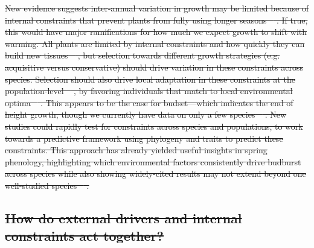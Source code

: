 \documentclass[11pt]{article}
\providecommand{\DIFdeltex}[1]{{\protect\color{red}\sout{#1}}}                      %
\providecommand{\DIFdelbegin}{} %
\providecommand{\DIFdelend}{} %
\providecommand{\DIFdel}[1]{\texorpdfstring{\DIFdeltex{#1}}{}} %
\newcommand{\DIFscaledelfig}{0.5}
\newlength{\DIFdelgraphicswidth} %
\newlength{\DIFdelgraphicsheight} %
\newcommand{\DIFdelincludegraphics}[2][]{%
\sbox{\DIFdelgraphicsbox}{\DIFOincludegraphics[#1]{#2}}%
\settoboxwidth{\DIFdelgraphicswidth}{\DIFdelgraphicsbox} %
\settoboxtotalheight{\DIFdelgraphicsheight}{\DIFdelgraphicsbox} %
\scalebox{\DIFscaledelfig}{%
\parbox[b]{\DIFdelgraphicswidth}{\usebox{\DIFdelgraphicsbox}\\[-\baselineskip] \rule{\DIFdelgraphicswidth}{0em}}\llap{\resizebox{\DIFdelgraphicswidth}{\DIFdelgraphicsheight}{%
\setlength{\unitlength}{\DIFdelgraphicswidth}%
\begin{picture}(1,1)%
\thicklines\linethickness{2pt} %
{\color[rgb]{1,0,0}\put(0,0){\framebox(1,1){}}}%
{\color[rgb]{1,0,0}\put(0,0){\line( 1,1){1}}}%
{\color[rgb]{1,0,0}\put(0,1){\line(1,-1){1}}}%
\end{picture}%
}\hspace*{3pt}}} %
} %
\DeclareRobustCommand{\DIFdelbegin}{\DIFOdelbegin \let\includegraphics\DIFdelincludegraphics} %
\DeclareRobustCommand{\DIFdelend}{\DIFOaddend \let\includegraphics\DIFOincludegraphics} %
\begin{document}
\DIFdelbegin \DIFdel{New evidence suggests inter-annual variation in growth may be limited because of internal constraints that prevent plants from fully using longer seasons \mbox{%
\citep{zohner2023effect}}\hskip0pt%
. If true, this would have major ramifications for how much we expect growth to shift with warming. All plants are limited by internal constraints and how quickly they can build new tissues \mbox{%
\citep{marchand2021timing,luo2024internal}}\hskip0pt%
, but selection towards different growth strategies (e.g. acquisitive versus conservative) should drive variation in these constraints across species. Selection should also drive local adaptation in these constraints at the population-level \mbox{%
\citep{mckown2016impacts,soolanayakanahally2013timing}}\hskip0pt%
, by favoring individuals that match to local environmental optima \mbox{%
\citep{Colautti:2010,mckown2014np}}\hskip0pt%
. This appears to be the case for budset---which indicates the end of height growth, though we currently have data on only a few species \mbox{%
\citep{aitken2016,zeng2024weak}}\hskip0pt%
. New studies could rapidly test for constraints across species and populations, to work towards a predictive framework using phylogeny and traits to predict these constraints. This approach has already yielded useful insights in spring phenology, highlighting which environmental factors consistently drive budburst across species while also showing widely-cited results may not extend beyond one well-studied species \mbox{%
\citep{morales2024phylogenetic}}\hskip0pt%
. %
}%

\subsection*{\DIFdel{How do external drivers and internal constraints act together?}}

\DIFdelend %
\end{document}
